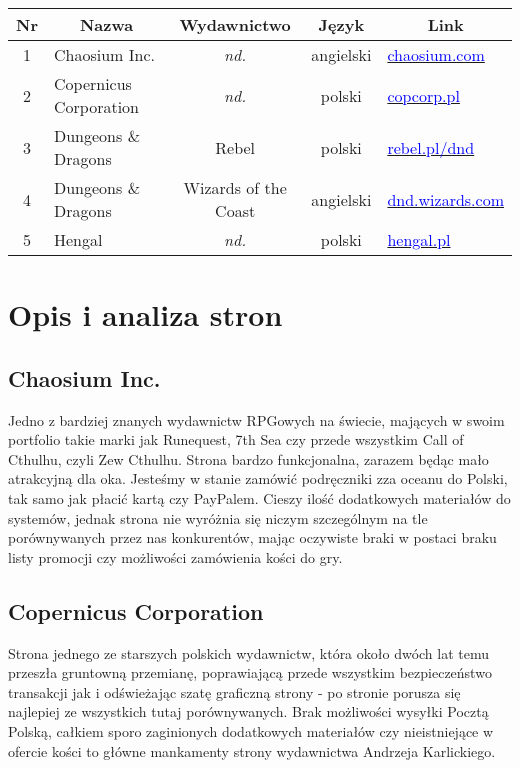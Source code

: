 \documentclass[a4paper,11pt]{article}
\begin{document}
\begin{tabular}{|c|l|c|c|l|}
	\hline
	\multicolumn{1}{|c}{\textbf{Nr}} & \multicolumn{1}{|c}{\textbf{Nazwa}} & \multicolumn{1}{|c}{\textbf{Wydawnictwo}} &\multicolumn{1}{|c}{\textbf{Język}} &\multicolumn{1}{|c|}{\textbf{Link}}\\
	\hline
	\hline
	1 & Chaosium Inc. & \textit{nd.} & angielski & \href{https://www.chaosium.com}{\textcolor{blue}{chaosium.com}} \\
	\hline
	2 & Copernicus Corporation & \textit{nd.} & polski & \href{https://copcorp.pl}{\textcolor{blue}{copcorp.pl}} \\
	\hline
	3 & Dungeons \& Dragons & Rebel & polski & \href{https://www.rebel.pl/dnd/}{\textcolor{blue}{rebel.pl/dnd}} \\
	\hline
	4 & Dungeons \& Dragons & Wizards of the Coast & angielski & \href{https://dnd.wizards.com}{\textcolor{blue}{dnd.wizards.com}} \\
	\hline
	5 & Hengal & \textit{nd.} & polski & \href{https://hengal.pl}{\textcolor{blue}{hengal.pl}} \\
	\hline
\end{tabular}


\section {Opis i analiza stron}

\subsection {Chaosium Inc.}

Jedno z bardziej znanych wydawnictw RPGowych na świecie, mających w swoim portfolio takie marki jak Runequest, 7th Sea czy przede wszystkim Call of Cthulhu, czyli Zew Cthulhu. Strona bardzo funkcjonalna, zarazem będąc mało atrakcyjną dla oka. Jesteśmy w stanie zamówić podręczniki zza oceanu do Polski, tak samo jak płacić kartą czy PayPalem. Cieszy ilość dodatkowych materiałów do systemów, jednak strona nie wyróżnia się niczym szczególnym na tle porównywanych przez nas konkurentów, mając oczywiste braki w postaci braku listy promocji czy możliwości zamówienia kości do gry. 

\subsection {Copernicus Corporation}

Strona jednego ze starszych polskich wydawnictw, która około dwóch lat temu przeszła gruntowną przemianę, poprawiającą przede wszystkim bezpieczeństwo transakcji jak i odświeżając szatę graficzną strony - po stronie porusza się najlepiej ze wszystkich tutaj porównywanych. Brak możliwości wysyłki Pocztą Polską, całkiem sporo zaginionych dodatkowych materiałów czy nieistniejące w ofercie kości to główne mankamenty strony wydawnictwa Andrzeja Karlickiego.
\end{document}
